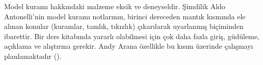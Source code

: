 \documentclass[../../include/open-logic-part]{subfiles}
\begin{document}

\begin{editorial}
  Model kuramı hakkındaki malzeme eksik ve deneyseldir. Şimdilik Aldo
  Antonelli'nin model kuramı notlarının, birinci dereceden mantık
  kısmında ele alınan konular (kuramlar, tamlık, tıkızlık) çıkarılarak
  uyarlanmış biçiminden ibarettir. Bir ders kitabında yararlı olabilmesi
  için çok daha fazla giriş, güdüleme, açıklama ve alıştırma gerekir.
  Andy Arana özellikle bu kısım üzerinde çalışmayı planlamaktadır
  ().
\end{editorial}





\OLEndPartHook
\end{document}
